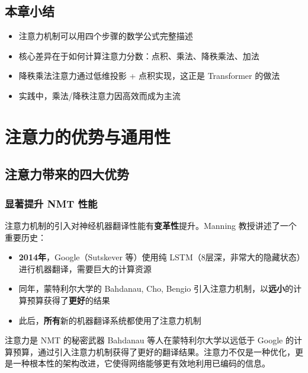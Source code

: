 \documentclass[a4paper]{article}
\begin{document}
\subsection{本章小结}

\begin{itemize}
    \item 注意力机制可以用四个步骤的数学公式完整描述
    \item 核心差异在于如何计算注意力分数：点积、乘法、降秩乘法、加法
    \item 降秩乘法注意力通过低维投影 + 点积实现，这正是 Transformer 的做法
    \item 实践中，乘法/降秩注意力因高效而成为主流
\end{itemize}


\section{注意力的优势与通用性}

\subsection{注意力带来的四大优势}





\subsubsection{显著提升 NMT 性能}

注意力机制的引入对神经机器翻译性能有\textbf{变革性}提升。Manning 教授讲述了一个重要历史：

\begin{itemize}
    \item \textbf{2014年}，Google（Sutskever 等）使用纯 LSTM（8层深，非常大的隐藏状态）进行机器翻译，需要巨大的计算资源
    \item 同年，蒙特利尔大学的 Bahdanau, Cho, Bengio 引入注意力机制，以\textbf{远小}的计算预算获得了\textbf{更好}的结果
    \item 此后，\textbf{所有}新的机器翻译系统都使用了注意力机制
\end{itemize}

\begin{importantbox}{注意力是 NMT 的秘密武器}
Bahdanau 等人在蒙特利尔大学以远低于 Google 的计算预算，通过引入注意力机制获得了更好的翻译结果。注意力不仅是一种优化，更是一种根本性的架构改进，它使得网络能够更有效地利用已编码的信息。
\end{importantbox}
\end{document}
